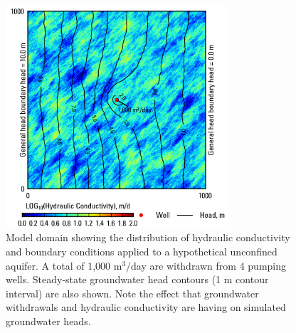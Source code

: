 \documentclass[12pt]{article}
\begin{document}
\newpage
\begin{figure}[hp]
	\centering
  	\includegraphics[width=8.25cm]{Figure2.png}
 	\caption{Model domain showing the distribution of hydraulic conductivity and boundary conditions applied to a hypothetical unconfined aquifer. A total of 1,000 m$^{3}$/day are withdrawn from 4 pumping wells. Steady-state groundwater head contours (1 m contour interval) are also shown. Note the effect that groundwater withdrawals and hydraulic conductivity are having on simulated groundwater heads.}
	\label{FigModelDomain}
\end{figure}
\end{document}
